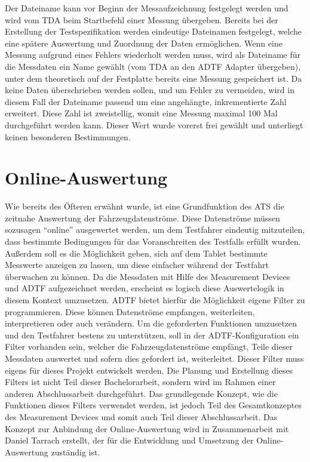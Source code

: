 \documentclass[12pt,a4paper]{report}
\begin{document}
Der Dateiname kann vor Beginn der Messaufzeichnung festgelegt werden und wird vom TDA beim Startbefehl einer Messung übergeben. Bereits bei der Erstellung der Testspezifikation werden eindeutige Dateinamen festgelegt, welche eine spätere Auswertung und Zuordnung der Daten ermöglichen. Wenn eine Messung aufgrund eines Fehlers wiederholt werden muss, wird als Dateiname für die Messdaten ein Name gewählt (vom TDA an den ADTF Adapter übergeben), unter dem theoretisch auf der Festplatte bereits eine Messung gespeichert ist. Da keine Daten überschrieben werden sollen, und um Fehler zu vermeiden, wird in diesem Fall der Dateiname passend um eine angehängte, inkrementierte Zahl erweitert. Diese Zahl ist zweistellig, womit eine Messung maximal 100 Mal durchgeführt werden kann. Dieser Wert wurde vorerst frei gewählt und unterliegt keinen besonderen Bestimmungen.
\section{Online-Auswertung}\label{sec:Online-Auswertung2}
Wie bereits des Öfteren erwähnt wurde, ist eine Grundfunktion des ATS die zeitnahe Auswertung der Fahrzeugdatenströme. Diese Datenströme müssen sozusagen "`online"' ausgewertet werden, um dem Testfahrer eindeutig mitzuteilen, dass bestimmte Bedingungen für das Voranschreiten des Testfalls erfüllt wurden. Außerdem soll es die Möglichkeit geben, sich auf dem Tablet bestimmte Messwerte anzeigen zu lassen, um diese einfacher während der Testfahrt überwachen zu können. Da die Messdaten mit Hilfe des Measurement Devices und ADTF aufgezeichnet werden, erscheint es logisch diese Auswertelogik in diesem Kontext umzusetzen. ADTF bietet hierfür die Möglichkeit eigene Filter zu programmieren. Diese können Datenströme empfangen, weiterleiten, interpretieren oder auch verändern. Um die geforderten Funktionen umzusetzen und den Testfahrer bestens zu unterstützen, soll in der ADTF-Konfiguration ein Filter vorhanden sein, welcher die Fahrzeugdatenströme empfängt, Teile dieser Messdaten auswertet und sofern dies gefordert ist, weiterleitet. Dieser Filter muss eigens für dieses Projekt entwickelt werden. Die Planung und Erstellung dieses Filters ist nicht Teil dieser Bachelorarbeit, sondern wird im Rahmen einer anderen Abschlussarbeit durchgeführt. Das grundlegende Konzept, wie die Funktionen dieses Filters verwendet werden, ist jedoch Teil des Gesamtkonzeptes des Measurement Devices und somit auch Teil dieser Abschlussarbeit. Das Konzept zur Anbindung der Online-Auswertung wird in Zusammenarbeit mit Daniel Tarrach erstellt, der für die Entwicklung und Umsetzung der Online-Auswertung zuständig ist.
\end{document}
